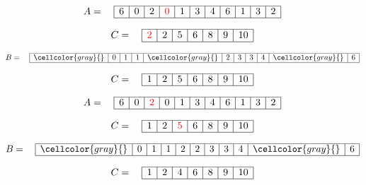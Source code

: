 \documentclass{article}
\begin{document}
\[
A = \quad
\begin{array}{|c|c|c|c|c|c|c|c|c|c|c|}
\hline
6 & 0 & 2 & \textcolor{red}{0} & 1 & 3 & 4 & 6 & 1 & 3 & 2 \\ 
\hline
\end{array}
\]

\[
C = \quad
\begin{array}{|c|c|c|c|c|c|c|}
\hline
\textcolor{red}{2} & 2 & 5 & 6 & 8 & 9 & 10 \\ 
\hline
\end{array}
\]

\[
B = \quad
\begin{array}{|c|c|c|c|c|c|c|c|c|c|c|}
\hline
\cellcolor{gray}{} & 0 & 1 & 
1 & \cellcolor{gray}{} & 2 & 
3 & 3 & 4 & 
\cellcolor{gray}{} & 6 \\ 
\hline
\end{array}
\]

\[
C = \quad
\begin{array}{|c|c|c|c|c|c|c|}
\hline
1 & 2 & 5 & 6 & 8 & 9 & 10 \\ 
\hline
\end{array}
\]


\begin{center}
\end{center}

\[
A = \quad
\begin{array}{|c|c|c|c|c|c|c|c|c|c|c|}
\hline
6 & 0 & \textcolor{red}{2} & 0 & 1 & 3 & 4 & 6 & 1 & 3 & 2 \\ 
\hline
\end{array}
\]

\[
C = \quad
\begin{array}{|c|c|c|c|c|c|c|}
\hline
1 & 2 & \textcolor{red}{5} & 6 & 8 & 9 & 10 \\ 
\hline
\end{array}
\]

\[
B = \quad
\begin{array}{|c|c|c|c|c|c|c|c|c|c|c|}
\hline
\cellcolor{gray}{} & 0 & 1 & 
1 & 2 & 2 & 
3 & 3 & 4 & 
\cellcolor{gray}{} & 6 \\ 
\hline
\end{array}
\]

\[
C = \quad
\begin{array}{|c|c|c|c|c|c|c|}
\hline
1 & 2 & 4 & 6 & 8 & 9 & 10 \\ 
\hline
\end{array}
\]
\end{document}
